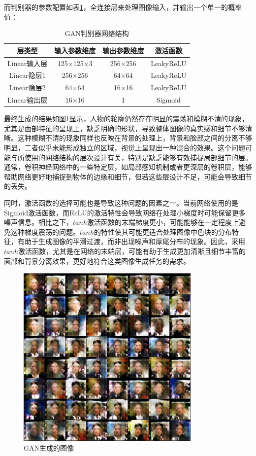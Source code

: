 \documentclass[UTF8]{ctexart}
\begin{document}
而判别器的参数配置如表\ref{tab:dis_gan}，全连接层来处理图像输入，并输出一个单一的概率值：
\begin{table}[htbp]
\centering
\caption{GAN判别器网络结构}
\label{tab:dis_gan}
\begin{tabular}{cccc}
\toprule[1.5pt]
\textbf{层类型} & \textbf{输入参数维度} & \textbf{输出参数维度} & \textbf{激活函数} \\
\midrule[1.5pt]
Linear输入层 & 125$\times$125$\times$3 & 256$\times$256 & LeakyReLU \\
Linear隐层1 & 256$\times$256 & 64$\times$64 & LeakyReLU \\
Linear隐层2 & 64$\times$64 & 16$\times$16 & LeakyReLU \\
Linear输出层 & 16$\times$16 & 1 & Sigmoid \\
\bottomrule[1.0pt]
\end{tabular}
\end{table}
最终生成的结果如图\ref{fig:GAN}显示，人物的轮廓仍然存在明显的震荡和模糊不清的现象，尤其是面部特征的呈现上，缺乏明确的形状，导致整体图像的真实感和细节不够清晰。这种模糊不清的现象同样也反映在背景的处理上，背景和脸部之间的分离不够明显，二者似乎未能形成独立的区域，视觉上呈现出一种混合的效果。这个问题可能与所使用的网络结构的层次设计有关，特别是缺乏能够有效捕捉局部细节的层。通常，卷积神经网络中的一些特定层，如局部感知机制或者更深层的卷积层，能够帮助网络更好地捕捉到物体的边缘和细节，但若这些层设计不足，可能会导致细节的丢失。\par
同时，激活函数的选择可能也是导致这种问题的因素之一。当前网络使用的是Sigmoid激活函数，而ReLU的激活特性会导致网络在处理小梯度时可能保留更多噪声信息。相比之下，$tanh$激活函数的末端梯度更小，可能能够在一定程度上避免这种梯度震荡的问题。$tanh$的特性使其可能更适合处理图像中色块的分布特征，有助于生成图像的平滑过渡，而非出现噪声和厚尾分布的现象。因此，采用$tanh$激活函数，尤其是在网络的末端层，可能有助于生成更加清晰且细节丰富的面部和背景分离效果，更好地符合这类图像生成任务的需求。
\begin{figure}[htbp]
\centering
\includegraphics[width=0.8\textwidth]{./images/GAN.png}
\caption{GAN生成的图像}
\label{fig:GAN}
\end{figure}
\end{document}
